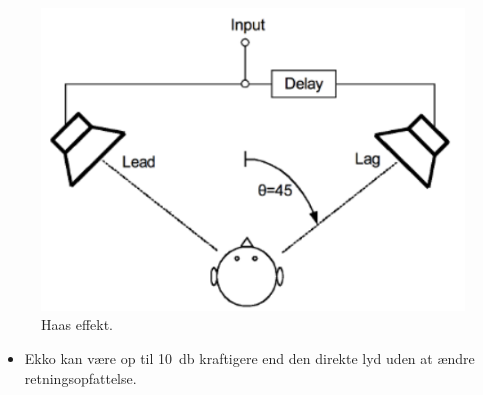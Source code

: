\begin{figure} [H]
	\centering
	\includegraphics[width=.6\linewidth]{graphics/49.png}
	\caption{Haas effekt.}
	\label{fig:49}
\end{figure}

\begin{itemize}
	\item Ekko kan være op til \SI{10}{\decibel} kraftigere end den direkte lyd uden at ændre retningsopfattelse.
\end{itemize}